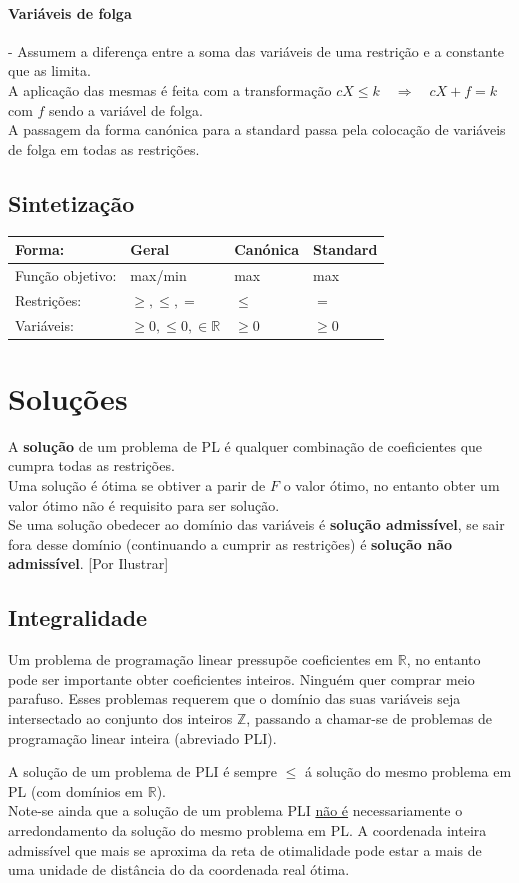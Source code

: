 \documentclass[]{report}
\begin{document}
\paragraph{Variáveis de folga} - Assumem a diferença entre a soma das variáveis de uma restrição e a constante que as limita.\\
A aplicação das mesmas é feita com a transformação $cX \leq k \quad \Rightarrow \quad cX + f = k$ com $f$ sendo a variável de folga.\\[0.5cm]
\noindent A passagem da forma canónica para a standard passa pela colocação de variáveis de folga em todas as restrições.
\subsection{Sintetização}
\begin{tabular}{l|l|l|l}
\textbf{Forma}:  & Geral           & Canónica & Standard \\\hline
Função objetivo: & max/min         & max      & max \\\hline
Restrições:      & $\geq,\leq, =$  & $\leq$   & $=$\\\hline
Variáveis:       & $\geq 0,\leq 0,\in \mathbb{R}$ & $\geq 0$ & $\geq 0$         
\end{tabular}
\section{Soluções}
A \textbf{solução} de um problema de PL é qualquer combinação de coeficientes que cumpra todas as restrições.\\
Uma solução é ótima se obtiver a parir de $F$ o valor ótimo, no entanto obter um valor ótimo não é requisito para ser solução.\\
Se uma solução obedecer ao domínio das variáveis é \textbf{solução admissível}, se sair fora desse domínio (continuando a cumprir as restrições) é \textbf{solução não admissível}. [Por Ilustrar]
\subsection{Integralidade}
Um problema de programação linear pressupõe coeficientes em $\mathbb{R}$, no entanto pode ser importante obter coeficientes inteiros. Ninguém quer comprar meio parafuso. Esses problemas requerem que o domínio das suas variáveis seja intersectado ao conjunto dos inteiros $\mathbb{Z}$, passando a chamar-se de problemas de programação linear inteira (abreviado PLI).\\ \par
A solução de um problema de PLI é sempre $\leq$ á solução do mesmo problema em PL (com domínios em $\mathbb{R}$).\\
Note-se ainda que a solução de um problema PLI \underline{não é} necessariamente o arredondamento da solução do mesmo problema em PL. A coordenada inteira admissível que mais se aproxima da reta de otimalidade pode estar a mais de uma unidade de distância do da coordenada real ótima.
\end{document}
